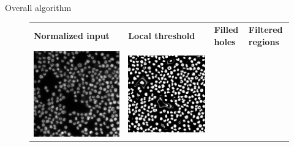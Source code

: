 Overall algorithm
\begin{figure}[H]
    \centering
    \centering
        \begin{tabularx}{\textwidth}{YYYY}
            \textbf{Normalized input} &
            \textbf{Local threshold} &
            \textbf{Filled holes} &
            \textbf{Filtered regions} \\
            \includegraphics{bilder/segmentation/nuclei-mask/normalized.png} & \includegraphics{bilder/segmentation/nuclei-mask/binary_local.png} &

\end{tabularx}
\end{figure}
